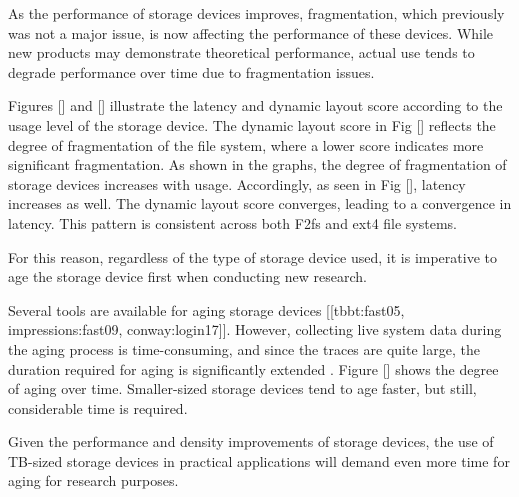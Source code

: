As the performance of storage devices improves, fragmentation, which previously was not a major issue, is now affecting the performance of these devices.
While new products may demonstrate theoretical performance, actual use tends to degrade performance over time due to fragmentation issues.

Figures [] and [] illustrate the latency and dynamic layout score according to the usage level of the storage device.
The dynamic layout score in Fig [] reflects the degree of fragmentation of the file system, where a lower score indicates more significant fragmentation.
As shown in the graphs, the degree of fragmentation of storage devices increases with usage. Accordingly, as seen in Fig [], latency increases as well.
The dynamic layout score converges, leading to a convergence in latency. This pattern is consistent across both F2fs and ext4 file systems.

For this reason, regardless of the type of storage device used, it is imperative to age the storage device first when conducting new research.

Several tools are available for aging storage devices [[tbbt:fast05, impressions:fast09, conway:login17]].
However, collecting live system data during the aging process is time-consuming, and since the traces are quite large, the duration required for aging is significantly extended \cite{fs_aging:sigmetrics97}.
Figure [] shows the degree of aging over time. Smaller-sized storage devices tend to age faster, but still, considerable time is required.

Given the performance and density improvements of storage devices, the use of TB-sized storage devices in practical applications will demand even more time for aging for research purposes.


